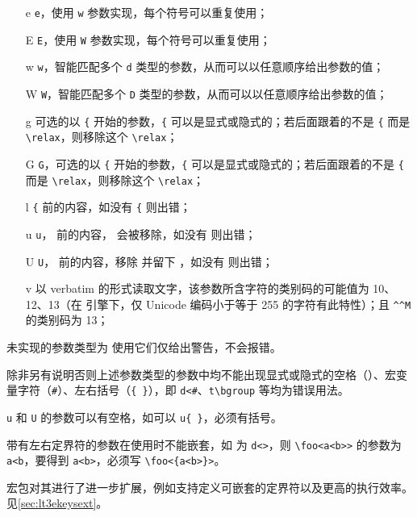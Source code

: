 \documentclass{cusdoc}
\begin{document}
{\begin{itemize}
  \item[\CCE e] \texttt e，使用 \texttt w 参数实现，每个符号可以重复使用；
  \item[\CCE E] \texttt E，使用 \texttt W 参数实现，每个符号可以重复使用；
  \item[\CCE w] \texttt w，智能匹配多个 \texttt d 类型的参数，从而可以以任意顺序给出参数的值；
  \item[\CCE W] \texttt W，智能匹配多个 \texttt D 类型的参数，从而可以以任意顺序给出参数的值；
  \item[\CCE g] 可选的以 \verb|{| 开始的参数，\verb|{| 可以是显式或隐式的；若后面跟着的不是 \verb|{| 而是 \verb|\relax|，则移除这个 \verb|\relax|；
  \item[\CCE G] \texttt G，可选的以 \verb|{| 开始的参数，\verb|{| 可以是显式或隐式的；若后面跟着的不是 \verb|{| 而是 \verb|\relax|，则移除这个 \verb|\relax|；
  \item[\CCS l] \verb|{| 前的内容，如没有 \verb|{| 则出错；
  \item[\CCS u] \texttt u， 前的内容， 会被移除，如没有  则出错；
  \item[\CCE U] \texttt U， 前的内容，移除  并留下 ，如没有  则出错；
  \item[\CCS v] 以 verbatim 的形式读取文字，该参数所含字符的类别码的可能值为 10、12、13（在 \pupTeX 引擎下，仅 Unicode 编码小于等于 255 的字符有此特性）；且 \texttt{\^{}\^{}M} 的类别码为 13；
\end{itemize}
}

未实现的参数类型为  使用它们仅给出警告，不会报错。

除非另有说明否则上述参数类型的参数中均不能出现显式或隐式的空格（\texttt\textvisiblespace）、宏变量字符（\texttt\#）、左右括号（\texttt{\{ \}}），即 \verb|d<#|、\verb|t\bgroup| 等均为错误用法。

\texttt u 和 \texttt U 的参数可以有空格，如可以 \verb|u{ }|，必须有括号。

带有左右定界符的参数在使用时不能嵌套，如  为 \verb|d<>|，则 \verb|\foo<a<b>>|
的参数为 \verb|a<b|，要得到 \verb|a<b>|，必须写 \verb|\foo<{a<b>}>|。

 宏包对其进行了进一步扩展，例如支持定义可嵌套的定界符以及更高的执行效率。见\cref{sec:lt3ekeysext}。
\end{document}
